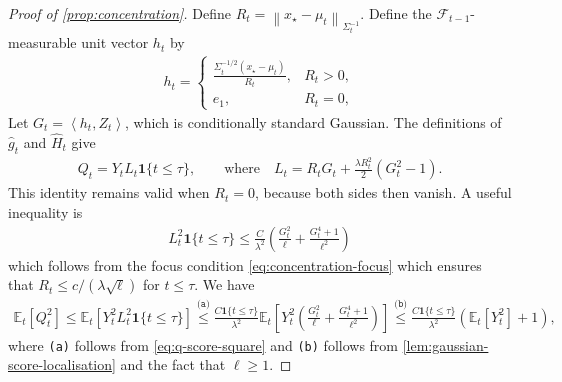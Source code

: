 \documentclass[11pt]{article}
\newcommand{\E}{\mathbb E}
\newcommand{\F}{\mathcal F}
\newcommand{\1}{\mathbf 1}
\newcommand{\ip}[2]{\left\langle #1,#2\right\rangle}
\newcommand{\normm}[2]{\left\lVert #1\right\rVert_{#2}}
\begin{document}
\begin{proof}[Proof of \cref{prop:concentration}]
    Define $R_t=\normm{x_\star-\mu_t}{\Sigma_t^{-1}}$.
    Define the $\F_{t-1}$-measurable unit vector $h_t$ by
    \begin{align}
        h_t
        =
        \begin{cases}
            \frac{\Sigma_t^{-1/2}(x_\star-\mu_t)}{R_t},
             & R_t>0, \\
            e_1,
             & R_t=0,
        \end{cases}
    \end{align}
    Let $G_t=\ip{h_t}{Z_t}$, which is conditionally standard Gaussian.  The
    definitions of $\widehat g_t$ and $\widehat H_t$ give
    \begin{align}
        Q_t
        =Y_tL_t\1\{t\leq\tau\},
        \qquad\text{where}\quad
        L_t
        =R_tG_t+\frac{\lambda R_t^2}{2}(G_t^2-1).
        \label{eq:q-score-representation}
    \end{align}
    This identity remains valid when $R_t=0$, because both sides then vanish.
    A useful inequality is
    \begin{align}
        L_t^2 \1\{t\leq\tau\}
        \leq
        \frac{C}{\lambda^2}
        \left(
        \frac{G_t^2}{\ell}
        +\frac{G_t^4+1}{\ell^2}
        \right)
        \label{eq:q-score-square}
    \end{align}
    which follows from the focus condition \eqref{eq:concentration-focus}
    which ensures that $R_t\leq c/(\lambda\sqrt\ell)$ for $t\leq\tau$.
    We have
    \begin{align}
        \E_t[Q_t^2]
        \leq
        \E_t[Y_t^2L_t^2\1\{t\leq\tau\}]
        \stackrel{\texttt{(a)}}{\leq}
        \frac{C\1\{t\leq\tau\}}{\lambda^2}
        \E_t\left[Y_t^2 \left(
            \frac{G_t^2}{\ell}
            +\frac{G_t^4+1}{\ell^2}
            \right)\right]
        \stackrel{\texttt{(b)}}{\leq}
        \frac{C\1\{t\leq\tau\}}{\lambda^2}
        \left(\E_t[Y_t^2]+1\right),
        \label{eq:q-predictable-second-moment}
    \end{align}
    where \texttt{(a)} follows from \eqref{eq:q-score-square} and \texttt{(b)} follows from \cref{lem:gaussian-score-localisation}
    and the fact that $\ell\geq 1$.


\end{proof}
\end{document}
